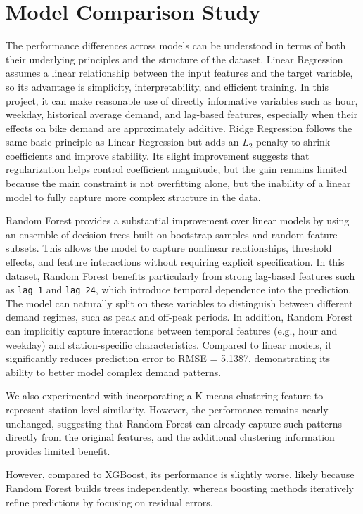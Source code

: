 \documentclass[11pt]{article}
\begin{document}
\section*{Model Comparison Study}
The performance differences across models can be understood in terms of both their underlying principles and the structure of the dataset. Linear Regression assumes a linear relationship between the input features and the target variable, so its advantage is simplicity, interpretability, and efficient training. In this project, it can make reasonable use of directly informative variables such as hour, weekday, historical average demand, and lag-based features, especially when their effects on bike demand are approximately additive. Ridge Regression follows the same basic principle as Linear Regression but adds an $L_2$ penalty to shrink coefficients and improve stability. Its slight improvement suggests that regularization helps control coefficient magnitude, but the gain remains limited because the main constraint is not overfitting alone, but the inability of a linear model to fully capture more complex structure in the data.

Random Forest provides a substantial improvement over linear models by using an ensemble of decision trees built on bootstrap samples and random feature subsets. This allows the model to capture nonlinear relationships, threshold effects, and feature interactions without requiring explicit specification. In this dataset, Random Forest benefits particularly from strong lag-based features such as \texttt{lag\_1} and \texttt{lag\_24}, which introduce temporal dependence into the prediction. The model can naturally split on these variables to distinguish between different demand regimes, such as peak and off-peak periods. In addition, Random Forest can implicitly capture interactions between temporal features (e.g., hour and weekday) and station-specific characteristics. Compared to linear models, it significantly reduces prediction error to RMSE = 5.1387, demonstrating its ability to better model complex demand patterns.

We also experimented with incorporating a K-means clustering feature to represent station-level similarity. However, the performance remains nearly unchanged, suggesting that Random Forest can already capture such patterns directly from the original features, and the additional clustering information provides limited benefit.

However, compared to XGBoost, its performance is slightly worse, likely because Random Forest builds trees independently, whereas boosting methods iteratively refine predictions by focusing on residual errors.
\end{document}
